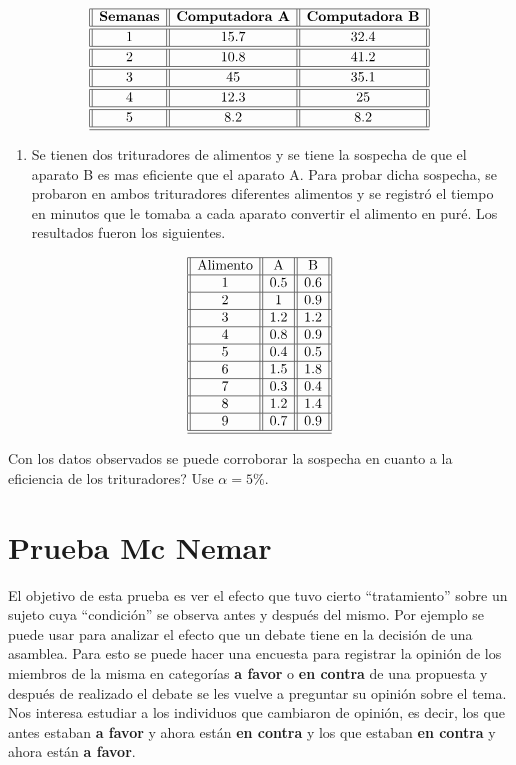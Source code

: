 \documentclass[
  a4paper,
  oneside,
  openany]{book}
\providecommand{\tightlist}{%
  \setlength{\itemsep}{0pt}\setlength{\parskip}{0pt}}
\begin{document}
\[
\begin{array}{||c| |c| |c||} 
\hline 
\textbf{Semanas} & \textbf{Computadora A} & \textbf{Computadora B} \\ 
\hline
\hline
1 &15.7& 32.4 \\
\hline
\hline
2& 10.8 &41.2 \\
\hline
\hline
3 &45   & 35.1 \\
\hline
\hline
4 &12.3& 25 \\
\hline
\hline
5 & 8.2&8.2 \\
\hline
\hline
\end{array}
\]

\begin{enumerate}
\def\labelenumi{\arabic{enumi}.}
\setcounter{enumi}{2}
\tightlist
\item
  Se tienen dos trituradores de alimentos y se tiene la sospecha de que el aparato B es mas eficiente que el aparato A. Para probar dicha sospecha, se probaron en ambos trituradores diferentes alimentos y se registró el tiempo en minutos que le tomaba a cada aparato convertir el alimento en puré. Los resultados fueron los siguientes.
\end{enumerate}

\[
\begin{array}{||c| |c| |c| |c|} 
\hline 
\mbox{Alimento} & \mbox{A} & \mbox{B}\\
 \hline
1&0.5&0.6\\
 \hline
2&1&0.9\\
 \hline
3&1.2&1.2\\
 \hline
4&0.8&0.9\\
 \hline
5&0.4&0.5\\
 \hline
6&1.5&1.8\\
 \hline
7&0.3&0.4\\
 \hline
8&1.2&1.4\\
 \hline
9&0.7&0.9\\
\hline
\hline
\end{array}
\]

Con los datos observados se puede corroborar la sospecha en cuanto a la eficiencia de los trituradores? Use \(\alpha=5\%.\)

\hypertarget{prueba-mc-nemar}{%
\chapter{Prueba Mc Nemar}\label{prueba-mc-nemar}}

El objetivo de esta prueba es ver el efecto que tuvo cierto ``tratamiento'' sobre un sujeto cuya ``condición'' se observa antes y después del mismo.
Por ejemplo se puede usar para analizar el efecto que un debate tiene en la decisión de una asamblea. Para esto se puede hacer una encuesta para registrar la opinión de los miembros de la misma en categorías \textbf{a favor} o \textbf{en contra} de una propuesta y después de realizado el debate se les vuelve a preguntar su opinión sobre el tema.
Nos interesa estudiar a los individuos que cambiaron de opinión, es decir, los que antes estaban \textbf{a favor} y ahora están \textbf{en contra} y los que estaban \textbf{en contra} y ahora están \textbf{a favor}.
\end{document}
